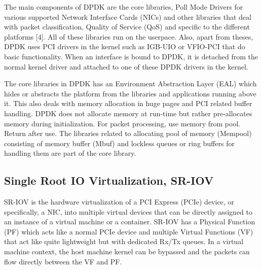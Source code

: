 \documentclass[english, 12pt, a4paper, elec, utf8, a-1b, online]{aaltothesis}
\begin{document}

The main components of DPDK are the core libraries, Poll Mode Drivers for various supported Network Interface Cards (NICs) and other libraries that deal with packet classification, Quality of Service (QoS) and specific to the different platforms [4]. All of these libraries run on the userpace. Also, apart from theses, DPDK uses PCI drivers in the kernel such as IGB-UIO or VFIO-PCI that do basic functionality. When an interface is bound to DPDK, it is detached from the normal kernel driver and attached to one of these DPDK drivers in the kernel.


The core libraries in DPDK has an Environment Abstraction Layer (EAL) which hides or abstracts the platform from the libraries and applications running above it. This also deals with memory allocation in huge pages and PCI related buffer handling. DPDK does not allocate memory at run-time but rather pre-allocates memory during initialization. For packet processing, use memory from pool. Return after use. The libraries related to allocating pool of memory (Mempool) consisting of memory buffer (Mbuf) and lockless queues or ring buffers for handling them are part of the core library.

\subsection{Single Root IO Virtualization, SR-IOV}
SR-IOV is the hardware virtualization of a PCI Express (PCIe) device, or specifically, a NIC, into multiple virtual devices that can be directly assigned to an instance of a virtual machine or a container. SR-IOV has a Physical Function (PF) which acts like a normal PCIe device and multiple Virtual Functions (VF) that act like quite lightweight but with dedicated Rx/Tx queues. In a virtual machine context, the host machine kernel can be bypassed and the packets can flow directly between the VF and PF.
\end{document}
